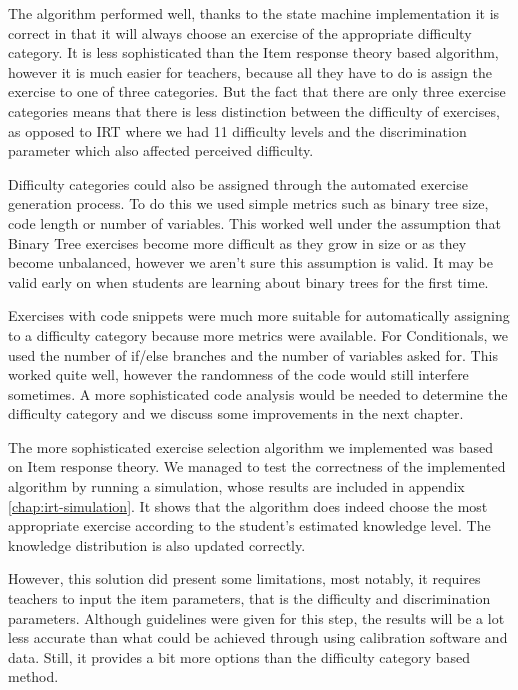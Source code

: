 The algorithm performed well, thanks to the state machine implementation it is correct in that it will always choose an exercise of the appropriate difficulty category. It is less sophisticated than the Item response theory based algorithm, however it is much easier for teachers, because all they have to do is assign the exercise to one of three categories. But the fact that there are only three exercise categories means that there is less distinction between the difficulty of exercises, as opposed to IRT where we had 11 difficulty levels and the discrimination parameter which also affected perceived difficulty.\newline

Difficulty categories could also be assigned through the automated exercise generation process. To do this we used simple metrics such as binary tree size, code length or number of variables. This worked well under the assumption that Binary Tree exercises become more difficult as they grow in size or as they become unbalanced, however we aren't sure this assumption is valid. It may be valid early on when students are learning about binary trees for the first time. \newline

Exercises with code snippets were much more suitable for automatically assigning to a difficulty category because more metrics were available. For Conditionals, we used the number of \textsf{if/else} branches and the number of variables asked for. This worked quite well, however the randomness of the code would still interfere sometimes. A more sophisticated code analysis would be needed to determine the difficulty category and we discuss some improvements in the next chapter.\newline

The more sophisticated exercise selection algorithm we implemented was based on Item response theory. We managed to test the correctness of the implemented algorithm by running a simulation, whose results are included in appendix \ref{chap:irt-simulation}. It shows that the algorithm does indeed choose the most appropriate exercise according to the student's estimated knowledge level. The knowledge distribution is also updated correctly.\newline

However, this solution did present some limitations, most notably, it requires teachers to input the item parameters, that is the difficulty and discrimination parameters. Although guidelines were given for this step, the results will be a lot less accurate than what could be achieved through using calibration software and data. Still, it provides a bit more options than the difficulty category based method. \newline

